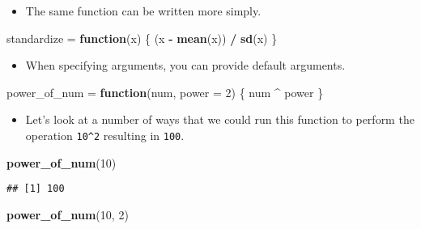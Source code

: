 \documentclass[]{book}
\newenvironment{Shaded}{\begin{snugshade}}{\end{snugshade}}
\newcommand{\ControlFlowTok}[1]{\textcolor[rgb]{0.13,0.29,0.53}{\textbf{#1}}}
\newcommand{\DataTypeTok}[1]{\textcolor[rgb]{0.13,0.29,0.53}{#1}}
\newcommand{\DecValTok}[1]{\textcolor[rgb]{0.00,0.00,0.81}{#1}}
\newcommand{\KeywordTok}[1]{\textcolor[rgb]{0.13,0.29,0.53}{\textbf{#1}}}
\newcommand{\NormalTok}[1]{#1}
\newcommand{\OperatorTok}[1]{\textcolor[rgb]{0.81,0.36,0.00}{\textbf{#1}}}
\newcommand{\StringTok}[1]{\textcolor[rgb]{0.31,0.60,0.02}{#1}}
\providecommand{\tightlist}{%
  \setlength{\itemsep}{0pt}\setlength{\parskip}{0pt}}
\begin{document}
\begin{itemize}
\tightlist
\item
  The same function can be written more simply.
\end{itemize}

\begin{Shaded}
\begin{Highlighting}[]
\NormalTok{standardize =}\StringTok{ }\ControlFlowTok{function}\NormalTok{(x) \{}
\NormalTok{  (x }\OperatorTok{-}\StringTok{ }\KeywordTok{mean}\NormalTok{(x)) }\OperatorTok{/}\StringTok{ }\KeywordTok{sd}\NormalTok{(x)}
\NormalTok{\}}
\end{Highlighting}
\end{Shaded}

\begin{itemize}
\tightlist
\item
  When specifying arguments, you can provide default arguments.
\end{itemize}

\begin{Shaded}
\begin{Highlighting}[]
\NormalTok{power_of_num =}\StringTok{ }\ControlFlowTok{function}\NormalTok{(num, }\DataTypeTok{power =} \DecValTok{2}\NormalTok{) \{}
\NormalTok{  num }\OperatorTok{^}\StringTok{ }\NormalTok{power}
\NormalTok{\}}
\end{Highlighting}
\end{Shaded}

\begin{itemize}
\tightlist
\item
  Let's look at a number of ways that we could run this function to perform the operation \texttt{10\^{}2} resulting in \texttt{100}.
\end{itemize}

\begin{Shaded}
\begin{Highlighting}[]
\KeywordTok{power_of_num}\NormalTok{(}\DecValTok{10}\NormalTok{)}
\end{Highlighting}
\end{Shaded}

\begin{verbatim}
## [1] 100
\end{verbatim}

\begin{Shaded}
\begin{Highlighting}[]
\KeywordTok{power_of_num}\NormalTok{(}\DecValTok{10}\NormalTok{, }\DecValTok{2}\NormalTok{)}
\end{Highlighting}
\end{Shaded}
\end{document}
